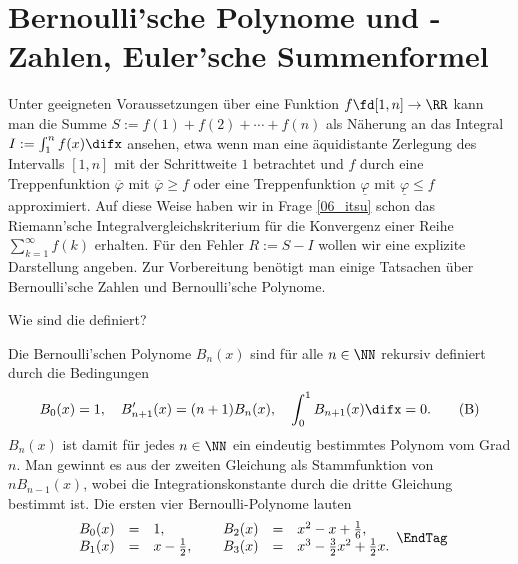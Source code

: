   \section{Bernoulli'sche Polynome und -Zahlen, Euler'sche Summenformel} 

  Unter geeigneten Voraussetzungen über eine Funktion 
  $f\fd [1,n]\to\RR$ kann man die Summe 
  $S := f(1)+f(2)+\cdots +f(n)$ als Näherung an das Integral 
  $I:= \int_1^n f(x)\difx $ ansehen, etwa wenn man eine 
  äquidistante Zerlegung des Intervalls $[1,n]$ mit der 
  Schrittweite $1$ betrachtet und $f$ durch eine Treppenfunktion 
  $\overline{\varphi}$ mit $\overline{\varphi} \ge f$ oder eine 
  Treppenfunktion $\underline{\varphi}$ mit $\underline{\varphi} \le f$ 
  approximiert. Auf diese Weise haben wir 
  in Frage \ref{06_itsu} schon das Riemann'sche 
  Integralvergleichskriterium für die Konvergenz einer Reihe 
  $\sum_{k=1}^\infty f(k)$ erhalten. Für den Fehler 
  $R := S-I$ wollen wir eine explizite Darstellung angeben. Zur Vorbereitung 
  benötigt man einige Tatsachen über Bernoulli'sche Zahlen und 
  Bernoulli'sche Polynome.


  \begin{frage}
    Wie sind die  definiert? 
  \end{frage}

  \begin{antwort}
    Die Bernoulli'schen Polynome $B_n(x)$ 
    sind für alle $n\in \NN$ 
    rekursiv definiert durch die Bedingungen 
    \begin{equation}
      B_0(x)=1, \quad B'_{n+1}(x)=(n+1) B_{n}(x),
      \quad \int_0^1 B_{n+1}(x) \difx =0.
      \tag{B}
    \end{equation}
    $B_n(x)$ ist damit für jedes $n\in \NN$ 
    ein eindeutig bestimmtes Polynom vom Grad $n$. 
    Man gewinnt es aus der zweiten Gleichung als 
    Stammfunktion von $n B_{n-1}(x)$, wobei die Integrationskonstante 
    durch die dritte Gleichung bestimmt ist. Die ersten vier 
    Bernoulli-Polynome lauten {\zB}
    \begin{equation}
      \begin{array}{rclp{1mm}rcl}
        B_0 (x) &=& 1, & & B_2(x) &=& x^2-x+\frac{1}{6}, \\
        B_1 (x) &=& x-\frac{1}{2}, & & B_3(x) &=& x^3-\frac{3}{2} x^2+\frac{1}{2}x. 
      \end{array}\EndTag
    \end{equation}
  \end{antwort}

